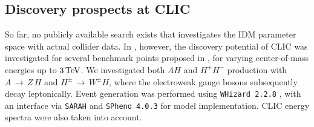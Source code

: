 \subsection{Discovery prospects at CLIC}
So far, no publicly available search exists that investigates the IDM parameter space with actual collider data. In \cite{Kalinowski:2018kdn,deBlas:2018mhx}, however, the discovery potential of CLIC was investigated for several benchmark points proposed in \cite{Kalinowski:2018ylg}, for varying center-of-mass energies up to $3\,{\rm TeV}$. We investigated both $AH$ and $H^+ H^-$ production with $A\,\rightarrow\,Z\,H$ and $H^\pm\,\rightarrow\,W^\pm H$, where the electroweak gauge bosons subsequently decay leptonically. Event generation was performed using \texttt{WHizard 2.2.8} \cite{Moretti:2001zz,Kilian:2007gr}, with an interface via \texttt{SARAH} \cite{Staub:2015kfa} and \texttt{SPheno 4.0.3} \cite{Porod:2003um,Porod:2011nf} for model implementation. CLIC energy spectra \cite{Linssen:2012hp} were also taken into account.

